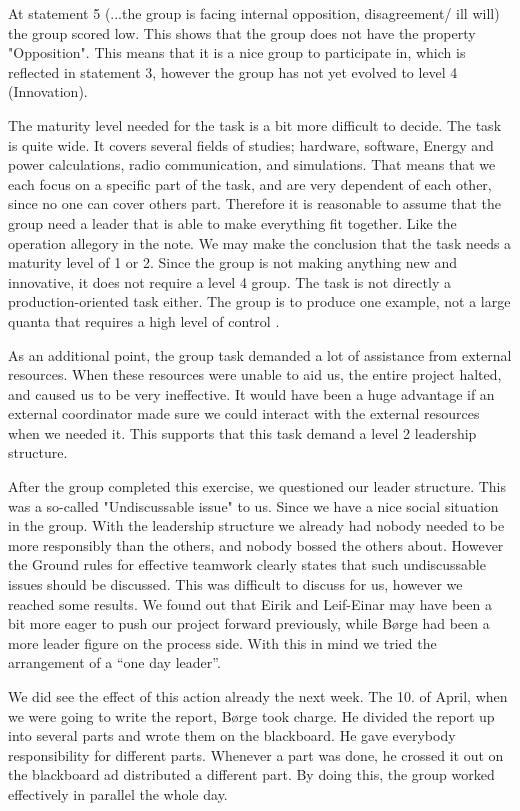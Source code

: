 At statement 5 (...the group is facing internal opposition, disagreement/ ill will) the group scored low. This shows that the group does not have the property "Opposition". This means that it is a nice group to participate in, which is reflected in statement 3, however the group has not yet evolved to level 4 (Innovation)\cite{Maturity}.
 
The maturity level needed for the task is a bit more difficult to decide. The task is quite wide. It covers several fields of studies; hardware, software, Energy and power calculations, radio communication, and simulations. That means that we each focus on a specific part of the task, and are very dependent of each other, since no one can cover others part. Therefore it is reasonable to assume that the group need a leader that is able to make everything fit together. Like the operation allegory in the note. We may make the conclusion that the task needs a maturity level of 1 or 2. Since the group is not making anything new and innovative, it does not require a level 4 group. The task is not directly a production-oriented task either. The group is to produce one example, not a large quanta that requires a high level of control \cite{Maturity}.

As an additional point, the group task demanded a lot of assistance from external resources. When these resources were unable to aid us, the entire project halted, and caused us to be very ineffective. It would have been a huge advantage if an external coordinator made sure we could interact with the external resources when we needed it. This supports that this task demand a level 2 leadership structure.

After the group completed this exercise, we questioned our leader structure. This was a so-called "Undiscussable issue" to us. Since we have a nice social situation in the group. With the leadership structure we already had nobody needed to be more responsibly than the others, and nobody bossed the others about. However the Ground rules for effective teamwork clearly states that such undiscussable issues should be discussed\cite{EffectiveGroups}. This was difficult to discuss for us, however we reached some results. We found out that Eirik and Leif-Einar may have been a bit more eager to push our project forward previously, while Børge had been a more leader figure on the process side. With this in mind we tried the arrangement of a “one day leader”. 

We did see the effect of this action already the next week. The 10. of April, when we were going to write the report, Børge took charge. He divided the report up into several parts and wrote them on the blackboard. He gave everybody responsibility for different parts. Whenever a part was done, he crossed it out on the blackboard ad distributed a different part. By doing this, the group worked effectively in parallel the whole day. 

